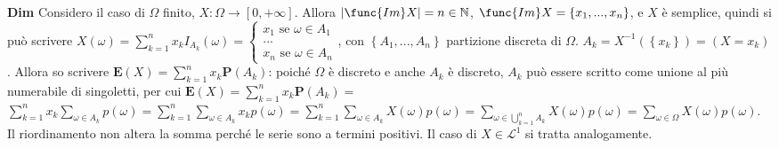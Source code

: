 \documentclass{article}
\begin{document}
\textbf{Dim} Considero il caso di $\Omega $ finito, $X:\Omega \rightarrow %
\left[ 0,+\infty \right] $. Allora $\left\vert \func{Im}X\right\vert =n\in 
\mathbb{N}
$, $\func{Im}X=\left\{ x_{1},...,x_{n}\right\} $, e $X$ \`{e} semplice,
quindi si pu\`{o} scrivere $X\left( \omega \right)
=\sum_{k=1}^{n}x_{k}I_{A_{k}}\left( \omega \right) =\left\{ 
\begin{array}{c}
x_{1}\text{ se }\omega \in A_{1} \\ 
... \\ 
x_{n}\text{ se }\omega \in A_{n}%
\end{array}%
\right. $, con $\left\{ A_{1},...,A_{n}\right\} $ partizione discreta di $%
\Omega $. $A_{k}=X^{-1}\left( \left\{ x_{k}\right\} \right) =\left(
X=x_{k}\right) $. Allora so scrivere $\mathbf{E}\left( X\right)
=\sum_{k=1}^{n}x_{k}\mathbf{P}\left( A_{k}\right) $: poich\'{e} $\Omega $ 
\`{e} discreto e anche $A_{k}$ \`{e} discreto, $A_{k}$ pu\`{o} essere
scritto come unione al pi\`{u} numerabile di singoletti, per cui $\mathbf{E}%
\left( X\right) =\sum_{k=1}^{n}x_{k}\mathbf{P}\left( A_{k}\right) =$ $%
\sum_{k=1}^{n}x_{k}\sum_{\omega \in A_{k}}p\left( \omega \right)
=\sum_{k=1}^{n}\sum_{\omega \in A_{k}}x_{k}p\left( \omega \right)
=\sum_{k=1}^{n}\sum_{\omega \in A_{k}}X\left( \omega \right) p\left( \omega
\right) =\sum_{\omega \in \bigcup_{k=1}^{n}A_{k}}X\left( \omega \right)
p\left( \omega \right) =\sum_{\omega \in \Omega }X\left( \omega \right)
p\left( \omega \right) $. Il riordinamento non altera la somma perch\'{e} le
serie sono a termini positivi. Il caso di $X\in \mathcal{L}^{1}$ si tratta
analogamente.
\end{document}
